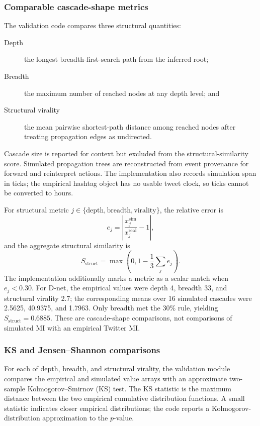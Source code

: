 \subsubsection{Comparable cascade-shape metrics}

The validation code compares three structural quantities:
\begin{description}
  \item[Depth] the longest breadth-first-search path from the inferred root;
  \item[Breadth] the maximum number of reached nodes at any depth level; and
  \item[Structural virality] the mean pairwise shortest-path distance among reached
        nodes after treating propagation edges as undirected.
\end{description}
Cascade size is reported for context but excluded from the structural-similarity
score.  Simulated propagation trees are reconstructed from event provenance for
forward and reinterpret actions.  The implementation also records simulation span in
ticks; the empirical hashtag object has no usable tweet clock, so ticks cannot be
converted to hours.

For structural metric \(j\in\{\text{depth},\text{breadth},\text{virality}\}\), the
relative error is
\[
  e_j=\left|\frac{x^{\mathrm{sim}}_j}{x^{\mathrm{real}}_j}-1\right|,
\]
and the aggregate structural similarity is
\begin{equation}
  S_{\mathrm{struct}}
  =\max\left(0,1-\frac{1}{3}\sum_j e_j\right).
  \label{eq:struct-sim}
\end{equation}
The implementation additionally marks a metric as a scalar match when
\(e_j<0.30\).  For D-net, the empirical values were depth 4, breadth 33, and structural
virality 2.7; the corresponding means over 16 simulated cascades were 2.5625,
40.9375, and 1.7963.  Only breadth met the 30\% rule, yielding
\(S_{\mathrm{struct}}=0.6885\).  These are cascade-shape comparisons, not comparisons
of simulated MI with an empirical Twitter MI.

\subsubsection{KS and Jensen--Shannon comparisons}

For each of depth, breadth, and structural virality, the validation module compares
the empirical and simulated value arrays with an approximate two-sample
Kolmogorov--Smirnov (KS) test.  The KS statistic is the maximum distance between the
two empirical cumulative distribution functions.  A small statistic indicates closer
empirical distributions; the code reports a Kolmogorov-distribution approximation to
the \(p\)-value.

